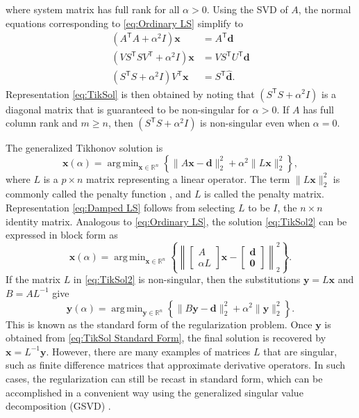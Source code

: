 \documentclass[12pt]{article}
\newcommand{\dVec}{\mathbf{d}}	%
\newcommand{\xVec}{\mathbf{x}}	%
\newcommand{\trans}[1]{{#1}^\mathsf{T}}	%
\newcommand{\regparam}{\alpha}
\DeclareMathOperator*{\argmin}{arg\,min}
\newcommand{\svd}[1]{\widehat{#1}}	%
\begin{document}
where system matrix has full rank for all $\regparam > 0$. Using the SVD of $A$, the normal equations corresponding to \eqref{eq:Ordinary LS} simplify to
\begin{align}
(\trans{A}A + \regparam^2 I)\xVec &= \trans{A}\dVec \nonumber \\
(V\trans{S}S\trans{V} + \regparam^2 I)\xVec &= V\trans{S}\trans{U}\dVec \nonumber \\
(\trans{S}S + \regparam^2 I)\trans{V}\xVec &= \trans{S}\svd{\dVec}.
\end{align}
Representation \eqref{eq:TikSol} is then obtained by noting that $(\trans{S}S + \regparam^2 I)$ is a diagonal matrix that is guaranteed to be non-singular for $\regparam > 0$. If $A$ has full column rank and $m \geq n$, then $(\trans{S}S + \regparam^2 I)$ is non-singular even when $\regparam = 0$. \par
The generalized Tikhonov solution is
\begin{equation}
\label{eq:TikSol2}
\xVec(\regparam) = \argmin_{\xVec \in \mathbb{R}^n} \left\{\|A\xVec - \dVec\|_2^2 + \regparam^2\|L\xVec\|_2^2\right\},
\end{equation}
where $L$ is a $p \times n$ matrix representing a linear operator. The term $\|L\xVec\|_2^2$ is commonly called the penalty function \cite{Vogel:2002}, and $L$ is called the penalty matrix. Representation \eqref{eq:Damped LS} follows from selecting $L$ to be $I$, the $n \times n$ identity matrix. Analogous to \eqref{eq:Ordinary LS}, the solution \eqref{eq:TikSol2} can be expressed in block form as
\begin{equation}
\xVec(\regparam) = \argmin_{\xVec \in \mathbb{R}^n} \left\{\left\| \begin{bmatrix}
A \\
\regparam L
\end{bmatrix}\xVec - \begin{bmatrix}
\dVec \\
\bm{0}
\end{bmatrix} \right\|_2^2\right\}.
\label{eq:TikSol3}
\end{equation}
If the matrix $L$ in \eqref{eq:TikSol2} is non-singular, then the substitutions $\mathbf{y} = L\xVec$ and $B = A{L}^{-1}$ give
\begin{equation}
\mathbf{y}(\regparam) = \argmin_{\mathbf{y} \in \mathbb{R}^n} \left\{\|B\mathbf{y} - \dVec\|_2^2 + \regparam^2\|\mathbf{y}\|_2^2\right\}.
\label{eq:TikSol Standard Form}
\end{equation}
This is known as the standard form of the regularization problem. Once $\mathbf{y}$ is obtained from \eqref{eq:TikSol Standard Form}, the final solution is recovered by $\xVec = L^{-1}\mathbf{y}$.  However, there are many examples of matrices $L$ that are singular, such as finite difference matrices that approximate derivative operators. In such cases, the regularization can still be recast in standard form, which can be accomplished in a convenient way using the generalized singular value decomposition (GSVD) \cite{HansenGSVD,Hansen:98}. \par
\end{document}
